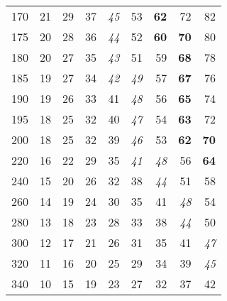 \documentclass[10pt,a4paper,oneside,extrafontsizes]{memoir}%
\begin{document}
\begin{table}
\begin{tabular}{r|rrrrrrrr}
170  & 21 & 29 & 37 & \textit{45} & 53 & \textbf{62} & 72 & 82 \\
175  & 20 & 28 & 36 & \textit{44} & 52 & \textbf{60} & \textbf{70} & 80 \\
180  & 20 & 27 & 35 & \textit{43} & 51 & 59 & \textbf{68} & 78 \\
185  & 19 & 27 & 34 & \textit{42} & \textit{49} & 57 & \textbf{67} & 76 \\
190  & 19 & 26 & 33 & 41 & \textit{48} & 56 & \textbf{65} & 74 \\
195  & 18 & 25 & 32 & 40 & \textit{47} & 54 & \textbf{63} & 72 \\
200  & 18 & 25 & 32 & 39 & \textit{46} & 53 & \textbf{62} & \textbf{70} \\ 
220  & 16 & 22 & 29 & 35 & \textit{41} & \textit{48} & 56 & \textbf{64} \\
240  & 15 & 20 & 26 & 32 & 38 & \textit{44} & 51 & 58 \\
260  & 14 & 19 & 24 & 30 & 35 & 41 & \textit{48} & 54 \\
280  & 13 & 18 & 23 & 28 & 33 & 38 & \textit{44} & 50 \\
300  & 12 & 17 & 21 & 26 & 31 & 35 & 41 & \textit{47} \\
320  & 11 & 16 & 20 & 25 & 29 & 34 & 39 & \textit{45} \\
340  & 10 & 15 & 19 & 23 & 27 & 32 & 37 & 42 \\
\hline
\end{tabular}
\end{table}
\end{document}
